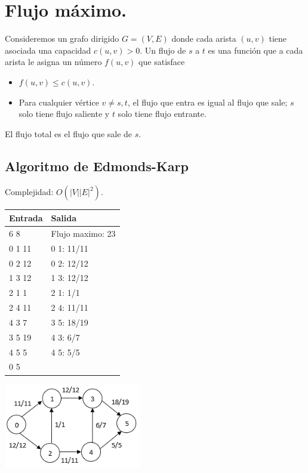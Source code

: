 \documentclass[12pt, letterpaper, twoside]{article}
\begin{document}
\newpage

\section{Flujo máximo.}

Consideremos un grafo dirigido $G = (V, E)$ donde cada arista $(u, v)$ tiene asociada una capacidad $c(u,v) > 0$. Un flujo de $s$ a $t$ es una función que a cada arista le asigna un número $f(u,v)$ que satisface
\begin{itemize}
\item $f(u, v) \leq c(u,v)$.
\item Para cualquier vértice $v \neq s, t$, el flujo que entra es igual al flujo que sale; $s$ solo tiene flujo saliente y $t$ solo tiene flujo entrante.
\end{itemize}
El flujo total es el flujo que sale de $s$.

\subsection{Algoritmo de Edmonds-Karp}

Complejidad: $O(|V||E|^2)$.

 \medskip

\begin{tabular}{|p{7cm}|p{7cm}|}
\hline
\textbf{Entrada} & \textbf{Salida}\\ \hline
6 8 & Flujo maximo: 23\\
0 1 11 & 0 1: 11/11\\
0 2 12 & 0 2: 12/12\\
1 3 12 & 1 3: 12/12\\
2 1 1  & 2 1: 1/1\\
2 4 11 & 2 4: 11/11\\
4 3 7  & 3 5: 18/19\\
3 5 19 & 4 3: 6/7\\
4 5 5 & 4 5: 5/5\\ 
0 5 & \\ \hline
\end{tabular}

\begin{center}
\includegraphics[width = 0.45\textwidth]{MaxFlow.png}
\end{center}
\end{document}
